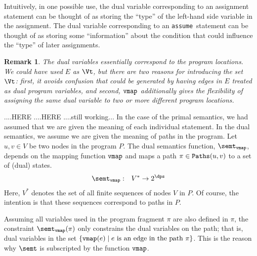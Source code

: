 \documentclass[preprint]{sig-alternate-05-2015}
\newtheorem{remark}{Remark}
\def\vmap{{\tt{vmap}}}
\def\paths{{\tt{Paths}}}
\def\assume{{\tt{assume}}}
\begin{document}
{Intuitively, in one possible use,
the dual variable corresponding to an assignment statement
can be thought of as storing the ``type'' of the left-hand side variable
in the assignment. The dual variable corresponding to an \assume\ statement
can be thought of as storing some ``information'' about the condition that
could influence the ``type'' of later assignments.


\begin{remark}
  The dual variables essentially correspond to the program locations.
  We could have used $E$ as $\Vt$, but there are two reasons for
  introducing the set $\Vt$: first, it avoids confusion that could
  be generated by having edges in $E$ treated as dual program variables, and
  second, $\vmap$ additionally gives the flexibility of assigning the
  same dual variable to two or more different program locations.
\end{remark}



....HERE ....HERE ....still working...
In the case of the primal semantics, we had assumed that we are given
the meaning of each individual statement.
In the dual semantics, we assume we are given the meaning of
paths in the program.
Let $u,v\in V$ be two nodes in the program $P$.
The dual semantics function, $\semt_\vmap$,
depends on the mapping function $\vmap$ and maps
a path $\pi\in\paths(u,v)$ to a set of (dual) states.
\begin{eqnarray}
 \semt_\vmap & : & V^* \rightarrow 2^\dps
 \label{eqn:dualOne}
\end{eqnarray}
Here, $V^*$ denotes the set of all finite sequences of nodes $V$ in $P$.
Of course, the intention is that these sequences correspond to paths in $P$.

Assuming all variables used in the program fragment $\pi$ are also
defined in $\pi$, the constraint $\semt_\vmap(\pi)$ 
only constrains the dual variables on the path; that is, dual variables
in the set $\{\vmap(e) \mid e\mbox{ is an edge in the path } \pi\}$.
This is the reason why $\semt$ is subscripted by the function $\vmap$.

}
\end{document}
